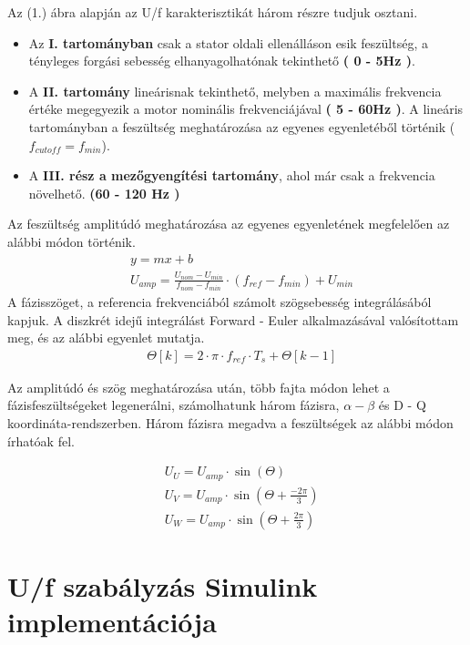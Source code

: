 \documentclass[a4paper,12pt]{article}
\newcommand\Pbracket[1]{\left(#1\right)}
\begin{document}
	\pagebreak
	
	Az (1.) ábra alapján az U/f karakterisztikát három részre tudjuk osztani.
	
	\begin{itemize}
		\item Az \textbf{I. tartományban} csak a stator oldali ellenálláson esik feszültség, a tényleges forgási sebesség elhanyagolhatónak tekinthető \textbf{( 0 - 5Hz )}.
		\item A \textbf{II. tartomány} lineárisnak tekinthető, melyben a maximális frekvencia értéke megegyezik a motor nominális frekvenciájával \textbf{( 5 - 60Hz )}. A lineáris tartományban a feszültség meghatározása az egyenes egyenletéből történik ($f_{cutoff} = f_{min}$).
		\item  A \textbf{III. rész a mezőgyengítési tartomány}, ahol már csak a frekvencia növelhető. \textbf{(60 - 120 Hz )}
	\end{itemize}
	
	Az feszültség amplitúdó meghatározása az egyenes egyenletének megfelelően az alábbi módon történik.
	\begin{align}
		& y = mx + b \\
		& U_{amp} = \frac{U_{nom} - U_{min}}{f_{nom} - {f_{min}}}\cdot (f_{ref} -f_{min} ) + U_{min}
	\end{align}
	A fázisszöget, a referencia frekvenciából számolt szögsebesség integrálásából kapjuk. A diszkrét idejű integrálást Forward - Euler alkalmazásával valósítottam meg, és az alábbi egyenlet mutatja.
	\begin{align}
	& \Theta[k] = 2 \cdot \pi \cdot f_{ref} \cdot T_s + \Theta[k-1]
	\end{align}
	
	Az amplitúdó és szög meghatározása után, több fajta módon lehet a fázisfeszültségeket legenerálni, számolhatunk három fázisra, $\alpha - \beta$ és D - Q koordináta-rendszerben. Három fázisra megadva a feszültségek az alábbi módon írhatóak fel.
	
	\begin{align}
		& U_U = U_{amp}  \cdot \sin \Pbracket{ \Theta } \\
		& U_V = U_{amp}  \cdot \sin \Pbracket{ \Theta + \frac{-2\pi}{3}} \\
		& U_W = U_{amp}  \cdot \sin \Pbracket{ \Theta + \frac{2\pi}{3}}
	\end{align}
	
	\pagebreak
	\section{U/f szabályzás Simulink implementációja}
	
\end{document}
